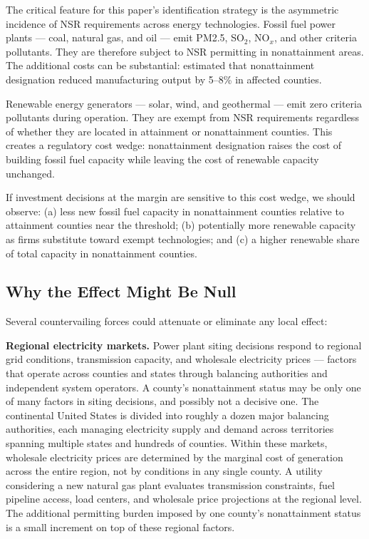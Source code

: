 \documentclass[12pt]{article}
\begin{document}
The critical feature for this paper's identification strategy is the asymmetric incidence of NSR requirements across energy technologies. Fossil fuel power plants --- coal, natural gas, and oil --- emit PM2.5, SO$_2$, NO$_x$, and other criteria pollutants. They are therefore subject to NSR permitting in nonattainment areas. The additional costs can be substantial: \citet{greenstone2002impact} estimated that nonattainment designation reduced manufacturing output by 5--8\% in affected counties.

Renewable energy generators --- solar, wind, and geothermal --- emit zero criteria pollutants during operation. They are exempt from NSR requirements regardless of whether they are located in attainment or nonattainment counties. This creates a regulatory cost wedge: nonattainment designation raises the cost of building fossil fuel capacity while leaving the cost of renewable capacity unchanged.

If investment decisions at the margin are sensitive to this cost wedge, we should observe: (a) less new fossil fuel capacity in nonattainment counties relative to attainment counties near the threshold; (b) potentially more renewable capacity as firms substitute toward exempt technologies; and (c) a higher renewable share of total capacity in nonattainment counties.

\subsection{Why the Effect Might Be Null}

Several countervailing forces could attenuate or eliminate any local effect:

\textbf{Regional electricity markets.} Power plant siting decisions respond to regional grid conditions, transmission capacity, and wholesale electricity prices --- factors that operate across counties and states through balancing authorities and independent system operators. A county's nonattainment status may be only one of many factors in siting decisions, and possibly not a decisive one. The continental United States is divided into roughly a dozen major balancing authorities, each managing electricity supply and demand across territories spanning multiple states and hundreds of counties. Within these markets, wholesale electricity prices are determined by the marginal cost of generation across the entire region, not by conditions in any single county. A utility considering a new natural gas plant evaluates transmission constraints, fuel pipeline access, load centers, and wholesale price projections at the regional level. The additional permitting burden imposed by one county's nonattainment status is a small increment on top of these regional factors.
\end{document}
